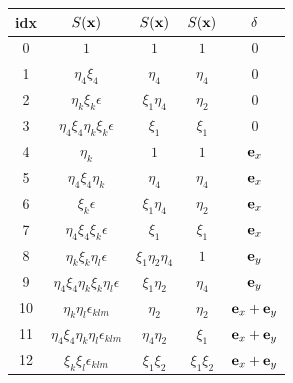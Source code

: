 \begin{table}
\begin{center}
\begin{tabular}{c|c|c|c|c}
\hline
 idx & $S({\bf x})$ & $S({\bf x})$ & $S({\bf x})$ & ${\bf \delta}$ \\
\hline
0  & $1$                                         & $1$                             & $1$            & $0$                             \\
1  & $\eta _4 \xi _4$                            & $\eta _4$                       & $\eta _4$      & $0$                             \\
2  & $\eta _k \xi _k \epsilon$                   & $\xi _1 \eta _4$                & $\eta _2$      & $0$                             \\
3  & $\eta _4 \xi _4\eta _k \xi _k \epsilon$     & $\xi _1 $                       & $\xi _1$       & $0$                             \\
4  & $\eta _k$                                   & $1$                             & $1$            & ${\bf e}_x$                     \\
5  & $\eta _4\xi _4\eta _k$                      & $\eta _4$                       & $\eta _4$      & ${\bf e}_x$                     \\
6  & $\xi _k\epsilon $                           & $\xi _1\eta_4 $                 & $\eta _2$      & ${\bf e}_x$                     \\
7  & $\eta _4\xi_4\xi_k\epsilon$                 & $\xi_1$                         & $\xi _1$       & ${\bf e}_x$                     \\
8  & $\eta _k\xi _k \eta _l \epsilon$            & $\xi _1 \eta _2 \eta _4$        & $1$            & ${\bf e}_y$                     \\
9  & $\eta_4\xi_4\eta_k\xi_k\eta_l\epsilon$      & $\xi_1\eta_2$                   & $\eta_4$       & ${\bf e}_y$                     \\
10 & $\eta _k\eta _l \epsilon _{klm}$            & $\eta _2 $                      & $\eta _2$      & ${\bf e}_x+{\bf e}_y$           \\
11 & $\eta_4\xi_4\eta _k\eta _l \epsilon _{klm}$ & $\eta_4\eta _2$                 & $\xi _1$       & ${\bf e}_x+{\bf e}_y$           \\
12 & $\xi _k\xi _l \epsilon _{klm}$              & $\xi _1\xi _2$                  & $\xi_1\xi_2$   & ${\bf e}_x+{\bf e}_y$           \\

\end{tabular}
\end{center}
\end{table}
